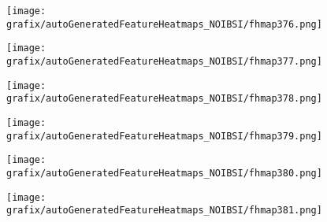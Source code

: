 \hspace{\hsp} 
\begin{subfigure}{\wid\textwidth} 
    \centering 
    \caption{\tiny \sffamily {}} 
    \vspace{\vsp} 
    \texttt{[image: grafix/autoGeneratedFeatureHeatmaps\_NOIBSI/fhmap376.png]} 
\end{subfigure} 
\hspace{\hsp} 
\begin{subfigure}{\wid\textwidth} 
    \centering 
    \caption{\tiny \sffamily {}} 
    \vspace{\vsp} 
    \texttt{[image: grafix/autoGeneratedFeatureHeatmaps\_NOIBSI/fhmap377.png]} 
\end{subfigure} 
\hspace{\hsp} 
\begin{subfigure}{\wid\textwidth} 
    \centering 
    \caption{\tiny \sffamily {}} 
    \vspace{\vsp} 
    \texttt{[image: grafix/autoGeneratedFeatureHeatmaps\_NOIBSI/fhmap378.png]} 
\end{subfigure} 
\hspace{\hsp} 
\begin{subfigure}{\wid\textwidth} 
    \centering 
    \caption{\tiny \sffamily {}} 
    \vspace{\vsp} 
    \texttt{[image: grafix/autoGeneratedFeatureHeatmaps\_NOIBSI/fhmap379.png]} 
\end{subfigure} 
\hspace{\hsp} 
\begin{subfigure}{\wid\textwidth} 
    \centering 
    \caption{\tiny \sffamily {}} 
    \vspace{\vsp} 
    \texttt{[image: grafix/autoGeneratedFeatureHeatmaps\_NOIBSI/fhmap380.png]} 
\end{subfigure} 
\hspace{\hsp} 
\begin{subfigure}{\wid\textwidth} 
    \centering 
    \caption{\tiny \sffamily {}} 
    \vspace{\vsp} 
    \texttt{[image: grafix/autoGeneratedFeatureHeatmaps\_NOIBSI/fhmap381.png]} 
\end{subfigure} 
\hspace{\hsp} 
